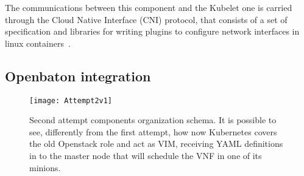 \begin{description}
  The communications between this component and the Kubelet one is carried
  through the Cloud Native Interface (CNI) protocol, that consists of a set
  of specification and libraries for writing plugins to configure network
  interfaces in linux containers~\cite{cnigithub}.
\end{description}

\subsection{Openbaton integration}

\begin{figure}[t]
  \centering
  \texttt{[image: Attempt2v1]}
  \caption[Second attempt components organization schema]{Second attempt
    components organization schema. It is possible to see, differently from the
    first attempt, how now Kubernetes covers the old Openstack role and act as
    VIM, receiving YAML definitions in to the master node that will schedule the
    VNF in one of its minions.}
  \label{chap:archimpl:sec:secondattempt:img:schema1}
\end{figure}

